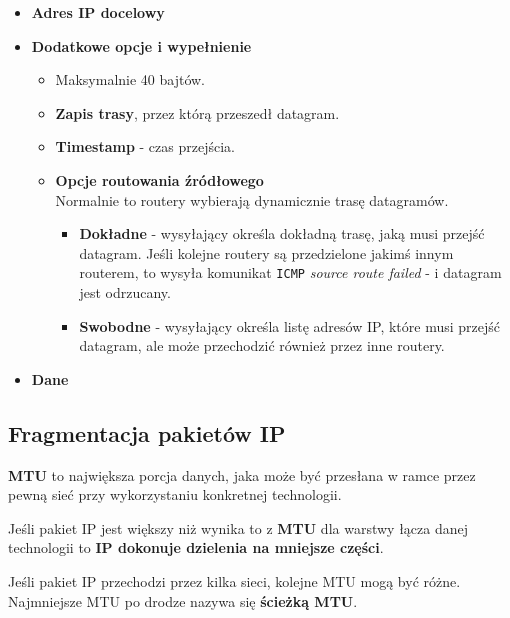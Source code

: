 \documentclass[../sk-egzamin.tex]{subfiles}
\begin{document}
\begin{itemize}
    \item \textbf{Adres IP docelowy} 
    \item \textbf{Dodatkowe opcje i wypełnienie} 
    \begin{itemize}
        \item Maksymalnie 40 bajtów.
        \item \textbf{Zapis trasy}, przez którą przeszedł datagram.
        \item \textbf{Timestamp} - czas przejścia.
        \item \textbf{Opcje routowania źródłowego}\\
        Normalnie to routery wybierają dynamicznie trasę datagramów.
        \begin{itemize}
            \item \textbf{Dokładne} - wysyłający określa dokładną trasę,
            jaką musi przejść datagram. Jeśli kolejne routery są przedzielone
            jakimś innym routerem, to wysyła komunikat \texttt{ICMP}
            \textit{source route failed} -  i datagram jest odrzucany.

            \item \textbf{Swobodne} - wysyłający określa listę adresów IP,
            które musi przejść datagram, ale może przechodzić również przez inne
            routery.
        \end{itemize}
    \end{itemize}
    \item \textbf{Dane} 
\end{itemize}

\subsection*{Fragmentacja pakietów IP}
\textbf{MTU } to największa porcja danych,
jaka może być przesłana w ramce przez pewną sieć 
przy wykorzystaniu konkretnej technologii.

Jeśli pakiet IP jest większy niż wynika to z \textbf{MTU} dla warstwy łącza
danej technologii to \textbf{IP dokonuje dzielenia na mniejsze części}.

Jeśli pakiet IP przechodzi przez kilka sieci, kolejne MTU mogą być różne.
Najmniejsze MTU po drodze nazywa się \textbf{ścieżką MTU}.
\end{document}
